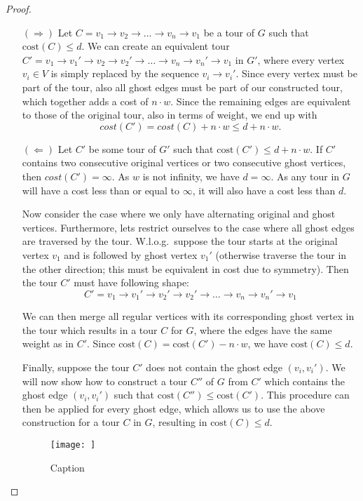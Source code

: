 \documentclass{article}
\begin{document}
\begin{proof}
    \begin{itemize}
        \item[$(\Rightarrow)$]  Let $C = v_1 \rightarrow v_2 \rightarrow \dots \rightarrow v_n \rightarrow v_1$ be a tour of $G$ such that $\text{cost}(C) \le d$. We can create an equivalent tour $C' = v_1 \rightarrow v_1' \rightarrow v_2\rightarrow v_2' \rightarrow \dots \rightarrow v_n \rightarrow v_n' \rightarrow v_1$ in $G'$, where every vertex $v_i \in V$ is simply replaced by the sequence $v_i \rightarrow v_i'$. Since every vertex must be part of the tour, also all ghost edges must be part of our constructed tour, which together adds a cost of $n \cdot w$. Since the remaining edges are equivalent to those of the original tour, also in terms of weight, we end up with \[cost(C') = cost(C) + n \cdot w \le d + n \cdot w.\]

        \item [$(\Leftarrow)$] Let $C'$ be some tour of $G'$ such that $\text{cost}(C') \le d + n \cdot w$. If $C'$ contains two consecutive original vertices or two consecutive ghost vertices, then $cost(C') = \infty$. As $w$ is not infinity, we have $d = \infty$. As any tour in $G$ will have a cost less than or equal to $\infty$, it will also have a cost less than $d$. 
        
        Now consider the case where we only have alternating original and ghost vertices. Furthermore, lets restrict ourselves to the case where all ghost edges are traversed by the tour. W.l.o.g.~suppose the tour starts at the original vertex $v_1$ and is followed by ghost vertex $v_1'$ (otherwise traverse the tour in the other direction; this must be equivalent in cost due to symmetry). Then the tour $C'$ must have following shape:
        \[
            C' = v_1 \rightarrow v_1' \rightarrow v_2'\rightarrow v_2' \rightarrow \dots \rightarrow v_n \rightarrow v_n' \rightarrow v_1
        \]
        
        We can then merge all regular vertices with its corresponding ghost vertex in the tour which results in a tour $C$ for $G$, where the edges have the same weight as in $C'$. Since $\text{cost}(C) = \text{cost}(C') - n \cdot w$, we have $\text{cost}(C) \le d$.

        Finally, suppose the tour $C'$ does not contain the ghost edge $(v_i, v_i')$. We will now show how to construct a tour $C''$ of $G$ from $C'$ which contains the ghost edge $(v_i, v_i')$ such that $\text{cost}(C'') \le \text{cost}(C')$. This procedure can then be applied for every ghost edge, which allows us to use the above construction for a tour $C$ in $G$, resulting in $\text{cost}(C) \le d$.

        \begin{figure}[]
            \centering
            \texttt{[image: ]}
            \caption{Caption}
            \label{fig:enter-label}
        \end{figure}

        

        
    \end{itemize}
    
   


\end{proof}
\end{document}
